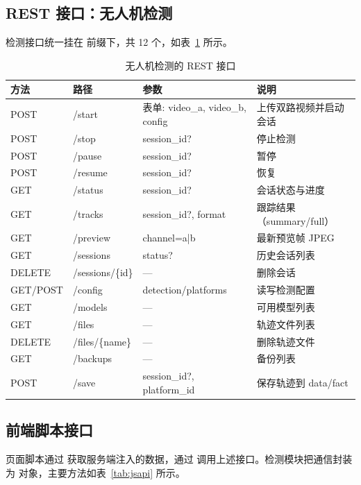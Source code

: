 \subsection{REST 接口：无人机检测}

检测接口统一挂在  前缀下，共 12 个，如表~\ref{tab:apidet} 所示。

\begin{table}[H]
\centering
\caption{无人机检测的 REST 接口}
\label{tab:apidet}
\footnotesize
\begin{tabularx}{\linewidth}{@{}>{\ttfamily\scriptsize}p{1.2cm}>{\raggedright\ttfamily\scriptsize}p{3.3cm}>{\raggedright\ttfamily\scriptsize}p{3.9cm}>{\raggedright\arraybackslash}X@{}}
\toprule
方法 & 路径 & 参数 & 说明 \\
\midrule
POST & /start & 表单: video\_a, video\_b, config & 上传双路视频并启动会话 \\
POST & /stop & session\_id? & 停止检测 \\
POST & /pause & session\_id? & 暂停 \\
POST & /resume & session\_id? & 恢复 \\
GET & /status & session\_id? & 会话状态与进度 \\
GET & /tracks & session\_id?, format & 跟踪结果（summary/full） \\
GET & /preview & channel=a|b & 最新预览帧 JPEG \\
GET & /sessions & status? & 历史会话列表 \\
DELETE & /sessions/\{id\} & --- & 删除会话 \\
GET/POST & /config & detection/platforms & 读写检测配置 \\
GET & /models & --- & 可用模型列表 \\
GET & /files & --- & 轨迹文件列表 \\
DELETE & /files/\{name\} & --- & 删除轨迹文件 \\
GET & /backups & --- & 备份列表 \\
POST & /save & session\_id?, platform\_id & 保存轨迹到 data/fact \\
\bottomrule
\end{tabularx}
\end{table}

\subsection{前端脚本接口}

页面脚本通过  获取服务端注入的数据，通过  调用上述接口。检测模块把通信封装为  对象，主要方法如表~\ref{tab:jsapi} 所示。

